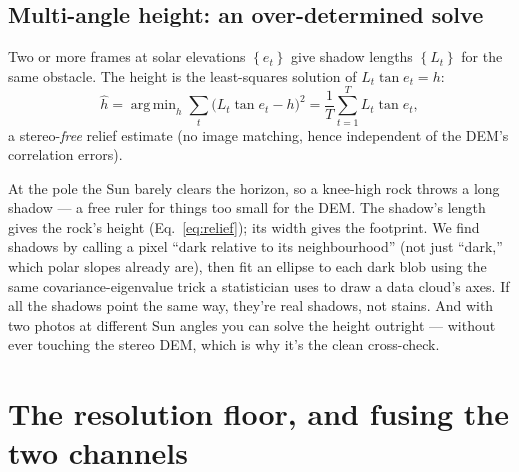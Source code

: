 \documentclass[11pt]{article}
\theoremstyle{definition}
\newcommand{\set}[1]{\left\{ #1 \right\}}
\DeclareMathOperator*{\argmin}{arg\,min}
\begin{document}
\subsection{Multi-angle height: an over-determined solve}
Two or more frames at solar elevations $\set{e_t}$ give shadow lengths $\set{L_t}$ for
the same obstacle. The height is the least-squares solution of $L_t\tan e_t=h$:
\begin{equation}
\widehat h=\argmin_{h}\sum_t\big(L_t\tan e_t-h\big)^2=\frac{1}{T}\sum_{t=1}^{T}L_t\tan e_t,
\end{equation}
a stereo-\emph{free} relief estimate (no image matching, hence independent of the DEM's
correlation errors).

\begin{words}
At the pole the Sun barely clears the horizon, so a knee-high rock throws a long
shadow --- a free ruler for things too small for the DEM. The shadow's length gives
the rock's height (Eq.~\ref{eq:relief}); its width gives the footprint. We find
shadows by calling a pixel ``dark relative to its neighbourhood'' (not just ``dark,''
which polar slopes already are), then fit an ellipse to each dark blob using the same
covariance-eigenvalue trick a statistician uses to draw a data cloud's axes. If all
the shadows point the same way, they're real shadows, not stains. And with two
photos at different Sun angles you can solve the height outright --- without ever
touching the stereo DEM, which is why it's the clean cross-check.
\end{words}

\section{The resolution floor, and fusing the two channels}
\end{document}
